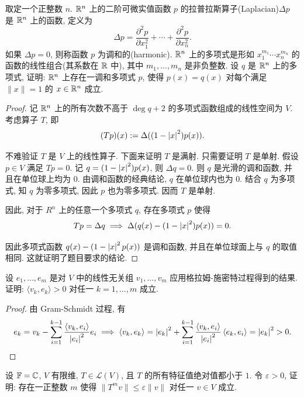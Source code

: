 \documentclass{article}
\begin{document}
\begin{problem}[6A-35]
取定一个正整数 $n$. $\mathbb{R}^n$ 上的二阶可微实值函数 $p$ 的拉普拉斯算子(Laplacian)$\Delta p$ 是 $\mathbb{R}^n$ 上的函数, 定义为
\[
\Delta p = \frac{\partial^2 p}{\partial x_1^2} + \cdots + \frac{\partial^2 p}{\partial x_n^2}.
\]
如果 $\Delta p = 0$, 则称函数 $p$ 为调和的(harmonic).
$\mathbb{R}^n$ 上的多项式是形如 $x_1^{m_1} \cdots x_n^{m_n}$ 的函数的线性组合(其系数在 $\mathbb{R}$ 中), 其中 $m_1, \ldots, m_n$ 是非负整数.
设 $q$ 是 $\mathbb{R}^n$ 上的多项式, 证明: $\mathbb{R}^n$ 上存在一调和多项式 $p$, 使得 $p(x) = q(x)$ 对每个满足 $\lVert x \rVert = 1$ 的 $x \in \mathbb{R}^n$ 成立.
\end{problem}

\begin{proof}
  记 \( \mathbb{R}^n \) 上的所有次数不高于 \( \deg q+2 \) 的多项式函数组成的线性空间为 \( V \). 考虑算子 \( T \), 即
  \[ (Tp)(x):=\Delta((1-\left|x\right|^2)p(x)). \]\par
  不难验证 \( T \) 是 \( V \) 上的线性算子. 下面来证明 \( T \) 是满射. 只需要证明 \( T \) 是单射.  假设 \( p\in V \) 满足 \( Tp=0 \). 记 \( q=(1-\left|x\right|^2)p(x) \), 则 \( \Delta q=0 \). 则 \( q \) 是光滑的调和函数, 并且在单位球上均为 \( 0 \). 由调和函数的经典结论, \( q \) 在单位球内也为 \( 0 \). 结合 \( q \) 为多项式, 知 \( q \) 为零多项式, 因此 \( p \) 也为零多项式. 因而 \( T \) 是单射.\par
  因此, 对于 \( R^n \) 上的任意一个多项式 \( q \), 存在多项式 \( p \) 使得
  \[ Tp=\Delta q\implies\Delta(q(x)-(1-\left|x\right|^2)p(x))=0. \]\par
  因此多项式函数 \( q(x)-(1-\left|x\right|^2p(x)) \) 是调和函数, 并且在单位球面上与 \( q \) 的取值相同. 这就证明了题目要求的结论.
\end{proof}



\begin{problem}[6B-9]
设 $e_1, \ldots, e_m$ 是对 $V$ 中的线性无关组 $v_1, \ldots, v_m$ 应用格拉姆-施密特过程得到的结果. 证明: $\langle v_k, e_k \rangle > 0$ 对任一 $k = 1, \ldots, m$ 成立.
\end{problem}

\begin{proof}
  由 Gram-Schmidt 过程, 有
  \[ e_k= v_k - \sum_{i=1}^{k-1} \frac{\left\langle v_k, e_i \right\rangle}{\left|e_i\right|^2} e_i\implies \left\langle v_k, e_k \right\rangle=\left|e_k\right|^2+ \sum_{i=1}^{k-1} \frac{\left\langle v_k, e_i \right\rangle}{\left|e_i\right|^2} \left\langle e_k, e_i \right\rangle=\left|e_k\right|^2>0. \]
\end{proof}



\begin{problem}[6B-21]
设 $\mathbb{F} = \mathbb{C}$, $V$ 有限维, $T \in \mathcal{L}(V)$, 且 $T$ 的所有特征值绝对值都小于 $1$. 令 $\varepsilon > 0$, 证明: 存在一正整数 $m$ 使得 $\lVert T^m v \rVert \le \varepsilon \lVert v \rVert$ 对任一 $v \in V$ 成立.
\end{problem}
\end{document}
